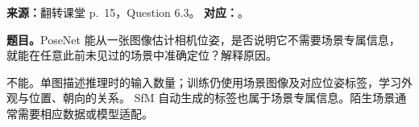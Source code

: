 \nopagebreak[4]

\textbf{来源：}翻转课堂 p.~15，Question 6.3。
\textbf{对应：}。
\nopagebreak[4]

\textbf{题目。}PoseNet 能从一张图像估计相机位姿，是否说明它不需要场景专属信息，
就能在任意此前未见过的场景中准确定位？解释原因。

\begin{checkedsolution}
不能。单图描述推理时的输入数量；训练仍使用场景图像及对应位姿标签，学习外观与位置、朝向的关系。
SfM 自动生成的标签也属于场景专属信息。陌生场景通常需要相应数据或模型适配。
\end{checkedsolution}
